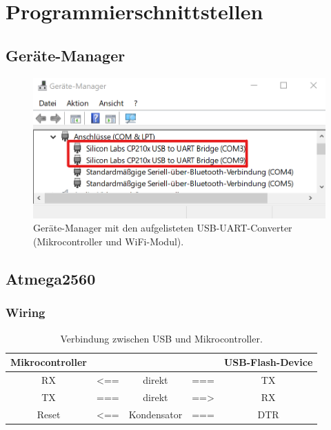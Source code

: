 
\section{Programmierschnittstellen}\label{Appendix:Programmierschnittstellen}

\subsection{Geräte-Manager}\label{Appendix:Geraete_Manager}

\begin{figure}[H]
\center
\includegraphics[width = 0.6 \textwidth]{graphics/USB_Devices_Ger_Man}
\caption{Geräte-Manager mit den aufgelisteten USB-UART-Converter (Mikrocontroller und WiFi-Modul).}
\label{fig:USB_Devices_Ger_Man}
\end{figure}


\subsection{Atmega2560}\label{Appendix:Handshake_uC}

\subsubsection{Wiring}\label{Appendix:Handshake_uC_wiring}

\begin{table}[H]
\center
\begin{tabular}{|c|lcl|c|}
\hline
\textbf{Mikrocontroller} & & & & \textbf{USB-Flash-Device} \\ \hline
RX & <== & direkt & === & TX  \\
TX & === & direkt & ==> & RX  \\
Reset & <== & Kondensator & === & DTR \\
\hline
\end{tabular}
\caption{Verbindung zwischen USB und Mikrocontroller.}
\label{tab:USB_uC}
\end{table}

